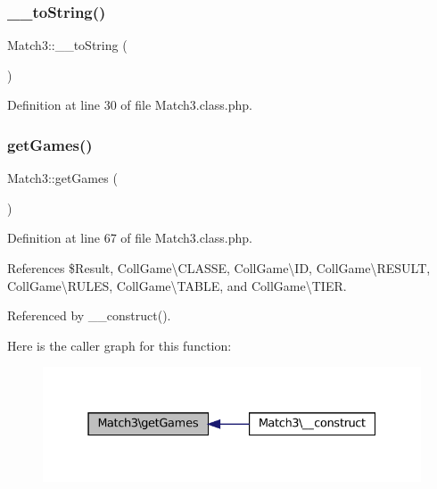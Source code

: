 \subsubsection{\texorpdfstring{\+\_\+\+\_\+to\+String()}{\_\_toString()}}
{\footnotesize\ttfamily Match3\+::\+\_\+\+\_\+to\+String (\begin{DoxyParamCaption}{ }\end{DoxyParamCaption})}



Definition at line 30 of file Match3.\+class.\+php.

\mbox{\label{class_match3_a5dc643e8436769e17857bdb2eb5b609e}} 
\subsubsection{\texorpdfstring{get\+Games()}{getGames()}}
{\footnotesize\ttfamily Match3\+::get\+Games (\begin{DoxyParamCaption}{ }\end{DoxyParamCaption})\hspace{0.3cm}{\ttfamily [protected]}}



Definition at line 67 of file Match3.\+class.\+php.



References \$\+Result, Coll\+Game\textbackslash{}\+C\+L\+A\+S\+SE, Coll\+Game\textbackslash{}\+ID, Coll\+Game\textbackslash{}\+R\+E\+S\+U\+LT, Coll\+Game\textbackslash{}\+R\+U\+L\+ES, Coll\+Game\textbackslash{}\+T\+A\+B\+LE, and Coll\+Game\textbackslash{}\+T\+I\+ER.



Referenced by \+\_\+\+\_\+construct().

Here is the caller graph for this function\+:\nopagebreak
\begin{figure}[H]
\begin{center}
\leavevmode
\includegraphics[width=331pt]{class_match3_a5dc643e8436769e17857bdb2eb5b609e_icgraph}
\end{center}
\end{figure}
\mbox{\label{class_match3_ae0c380ef50af1cfe343153b991ba18a7}} 
